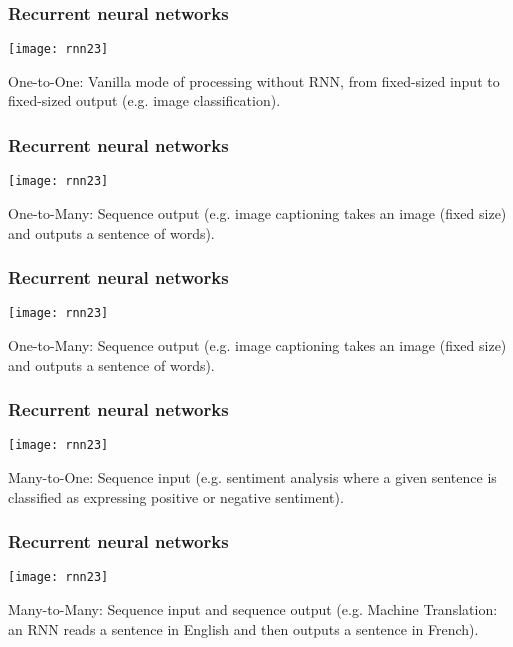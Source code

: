 \begin{frame}[fragile] \frametitle{Recurrent neural networks}
\begin{center}
\texttt{[image: rnn23]}
\end{center}
One-to-One: Vanilla mode of processing without RNN, from fixed-sized input to fixed-sized output (e.g. image classification).
\end{frame}

\begin{frame}[fragile] \frametitle{Recurrent neural networks}
\begin{center}
\texttt{[image: rnn23]}
\end{center}
One-to-Many: Sequence output (e.g. image captioning takes an image (fixed size) and outputs a sentence of words).
\end{frame}

\begin{frame}[fragile] \frametitle{Recurrent neural networks}
\begin{center}
\texttt{[image: rnn23]}
\end{center}
One-to-Many: Sequence output (e.g. image captioning takes an image (fixed size) and outputs a sentence of words).
\end{frame}

\begin{frame}[fragile] \frametitle{Recurrent neural networks}
\begin{center}
\texttt{[image: rnn23]}
\end{center}
Many-to-One: Sequence input (e.g. sentiment analysis where a given sentence is classified as expressing positive or negative sentiment).
\end{frame}

\begin{frame}[fragile] \frametitle{Recurrent neural networks}
\begin{center}
\texttt{[image: rnn23]}
\end{center}
Many-to-Many: Sequence input and sequence output (e.g. Machine Translation: an RNN reads a sentence in English and then outputs a sentence in French).
\end{frame}

